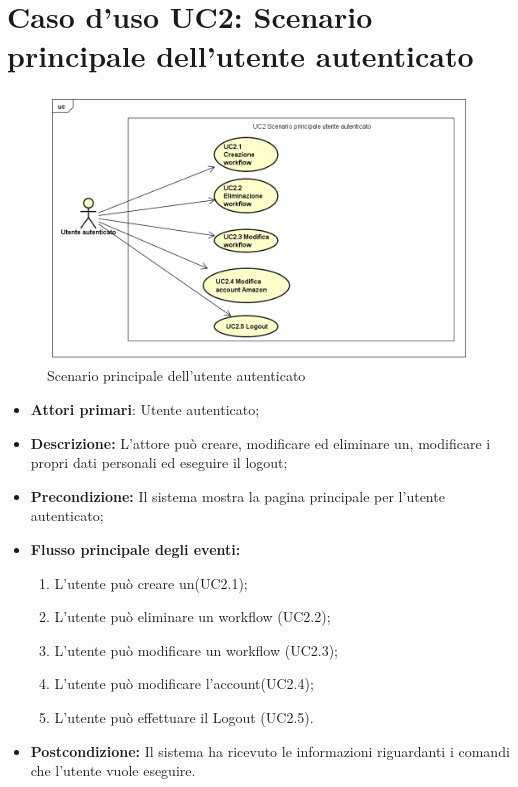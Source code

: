 		\section{Caso d'uso UC2: Scenario principale dell'utente autenticato}
		\begin{figure} [h]
			\centering
			\includegraphics[scale=0.4]{./Diagram/UC2.png}
			\caption{Scenario principale dell'utente autenticato }\label{}
		\end{figure}
		\begin{itemize}
			\item \textbf{Attori primari}: Utente autenticato;
			\item \textbf{Descrizione:} L'attore può creare, modificare ed eliminare un, modificare i propri dati personali ed eseguire il logout;
			\item \textbf{Precondizione:} Il sistema mostra la pagina principale per l'utente autenticato;
			\item \textbf{Flusso principale degli eventi:}
			\begin{enumerate}
				\item L'utente può creare un(UC2.1);
				\item L'utente può eliminare un workflow (UC2.2);
				\item L'utente può modificare un workflow (UC2.3);
				\item L'utente può modificare l'account(UC2.4);
				\item L'utente può effettuare il Logout (UC2.5).
			\end{enumerate}
			\item \textbf{Postcondizione:} Il sistema ha ricevuto le informazioni riguardanti i comandi che l'utente vuole eseguire.
		\end{itemize}
